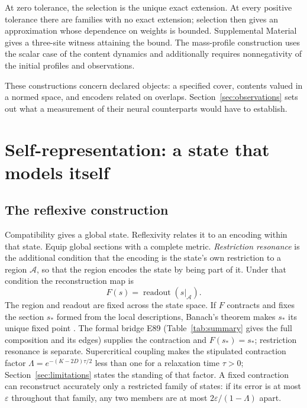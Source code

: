 \documentclass[12pt]{article}
\renewcommand{\cite}[1]{\citep{#1}}
\begin{document}
At zero tolerance, the selection is the unique exact extension. At every positive tolerance there are families with no exact extension; selection then gives an approximation whose dependence on weights is bounded. Supplemental Material gives a three-site witness attaining the bound. The mass-profile construction uses the scalar case of the content dynamics and additionally requires nonnegativity of the initial profiles and observations.

These constructions concern declared objects: a specified cover, contents valued in a normed space, and encoders related on overlaps. Section~\ref{sec:observations} sets out what a measurement of their neural counterparts would have to establish.

\section{Self-representation: a state that models itself}
\label{sec:self}

\subsection{The reflexive construction}

Compatibility gives a global state. Reflexivity relates it to an encoding within that state. Equip global sections with a complete metric. \emph{Restriction resonance} is the additional condition that the encoding is the state's own restriction to a region $\mathcal{A}$, so that the region encodes the state by being part of it. Under that condition the reconstruction map is
\begin{equation}
 F(s)=\operatorname{readout}(s|_{\mathcal{A}}).
 \label{eq:selfmap}
\end{equation}
The region and readout are fixed across the state space. If $F$ contracts and fixes the section $s_*$ formed from the local descriptions, Banach's theorem makes $s_*$ its unique fixed point \cite{banach1922}. The formal bridge E89 (Table~\ref{tab:summary} gives the full composition and its edges) supplies the contraction and $F(s_*)=s_*$; restriction resonance is separate. Supercritical coupling makes the stipulated contraction factor $\Lambda=e^{-(K-2D)\tau/2}$ less than one for a relaxation time $\tau>0$; Section~\ref{sec:limitations} states the standing of that factor. A fixed contraction can reconstruct accurately only a restricted family of states: if its error is at most $\varepsilon$ throughout that family, any two members are at most $2\varepsilon/(1-\Lambda)$ apart.
\end{document}
